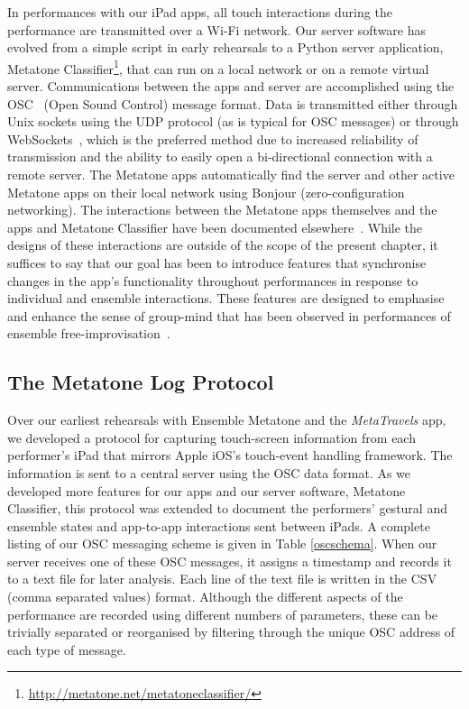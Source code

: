 \documentclass[graybox]{svmult}
\begin{document}
In performances with our iPad apps, all touch interactions during the
performance are transmitted over a Wi-Fi network. Our server software
has evolved from a simple script in early rehearsals to a Python
server application, Metatone
Classifier\footnote{\url{http://metatone.net/metatoneclassifier/}},
that can run on a local network or on a remote virtual server.
Communications between the apps and server are accomplished using the
OSC~\cite{osc-nime2009} (Open Sound Control) message format. Data is
transmitted either through Unix sockets using the UDP protocol (as is
typical for OSC messages) or through WebSockets~\cite{Fette:2011eu},
which is the preferred method due to increased reliability of
transmission and the ability to easily open a bi-directional
connection with a remote server. The Metatone apps automatically find
the server and other active Metatone apps on their local network using
Bonjour (zero-configuration networking). The interactions between the
Metatone apps themselves and the apps and Metatone Classifier have
been documented elsewhere~\cite{Martin:2015mz,Martin:2015jk}. While
the designs of these interactions are outside of the scope of the
present chapter, it suffices to say that our goal has been to
introduce features that synchronise changes in the app's functionality
throughout performances in response to individual and ensemble
interactions. These features are designed to emphasise and enhance the
sense of group-mind that has been observed in performances of ensemble
free-improvisation~\cite{Borgo:2006fv}. 

\subsection{The Metatone Log Protocol}
\label{subsec:metatone-log}

Over our earliest rehearsals with Ensemble Metatone and the
\emph{MetaTravels} app, we developed a protocol for capturing
touch-screen information from each performer's iPad that mirrors Apple
iOS's touch-event handling framework. The information is sent to a
central server using the OSC data format. As we developed more
features for our apps and our server software, Metatone Classifier,
this protocol was extended to document the performers' gestural and
ensemble states and app-to-app interactions sent between iPads. A
complete listing of our OSC messaging scheme is given in Table
\ref{oscschema}. When our server receives one of these OSC messages,
it assigns a timestamp and records it to a text file for later
analysis. Each line of the text file is written in the CSV (comma
separated values) format. Although the different aspects of the
performance are recorded using different numbers of parameters, these
can be trivially separated or reorganised by filtering through the
unique OSC address of each type of message.
\end{document}

